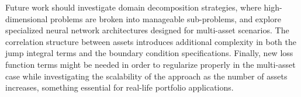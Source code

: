 \documentclass[11pt,twoside,openright]{report}
\begin{document}
Future work should investigate domain decomposition strategies, where high-dimensional problems are broken into manageable sub-problems, and explore specialized neural network architectures designed for multi-asset scenarios. The correlation structure between assets introduces additional complexity in both the jump integral terms and the boundary condition specifications. Finally, new loss function terms might be needed in order to regularize properly in the multi-asset case while investigating the scalability of the approach as the number of assets increases, something essential for real-life portfolio applications.

\cleardoublepage


\end{document}
